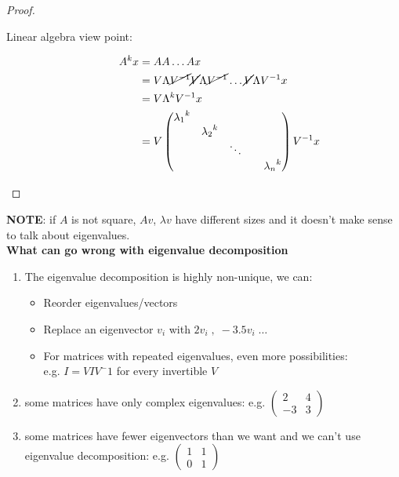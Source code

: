 \documentclass[ComputationalMathematics.tex]{subfiles}
\begin{document}
\begin{proof}~\\
  \begin{description}
  \item[{\sc Linear algebra view point:}]
    \begin{equation}
      \begin{split}
        A^k x &= A A \ldots A x\\
        &=V \Lambda \cancel{{V}^{-1}} \cancel{V} \Lambda \cancel{{V}^{-1}} \ldots \cancel{V} \Lambda {V}^{-1} x\\
        &= V \Lambda^k {V}^{-1} x\\
        &=V \begin{pmatrix}
          {\lambda_1}^k\\
          & {\lambda_2}^k\\
          && \ddots\\
          &&&& {\lambda_n}^k\\
        \end{pmatrix}
        {V}^{-1} x
      \end{split}
    \end{equation}

  \end{description}
\end{proof}

\noindent \textbf{NOTE}: if $A$ is not square, $Av$, $\lambda v$ have different sizes and it doesn't make sense to talk about eigenvalues.\\

\noindent \textbf{What can go wrong with eigenvalue decomposition}
\begin{enumerate}
    \item  The eigenvalue decomposition is highly non-unique, we can:
    \begin{itemize}
        \item Reorder eigenvalues/vectors
        \item Replace an eigenvector $v_i$ with $2v_i \;,\; −3.5v_i\; \dots$
        \item For matrices with repeated eigenvalues, even more possibilities:\\
        e.g. $I = VIV^-1$ for every invertible $V$
    \end{itemize}
    
    \item  some matrices have only complex eigenvalues: e.g. $\begin{pmatrix} 2 & 4\\ -3 & 3\end{pmatrix}$
    
    \item some matrices have fewer eigenvectors than we want and we can't use eigenvalue decomposition: e.g. $\begin{pmatrix} 1 & 1\\ 0 & 1\end{pmatrix}$
    
\end{enumerate}
\end{document}
